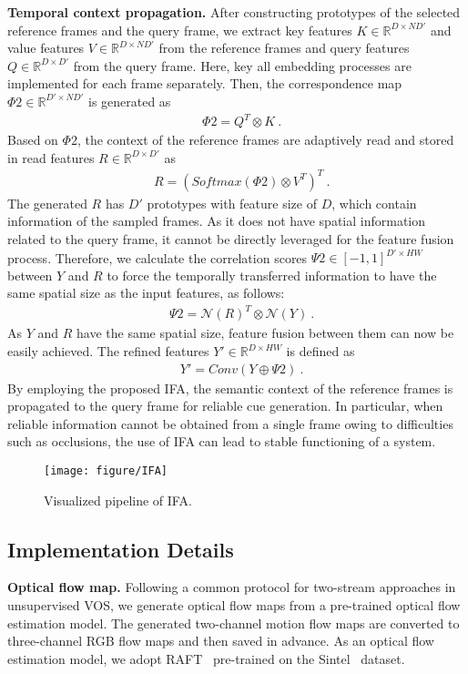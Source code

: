 \documentclass[10pt,twocolumn,letterpaper]{article}
\begin{document}
\vspace{1mm}
\noindent\textbf{Temporal context propagation.} After constructing prototypes of the selected reference frames and the query frame, we extract key features $K \in \mathbb{R}^{D \times ND'}$ and value features $V \in \mathbb{R}^{D \times ND'}$ from the reference frames and query features $Q \in \mathbb{R}^{D \times D'}$ from the query frame. Here, key all embedding processes are implemented for each frame separately. Then, the correspondence map $\Phi2 \in \mathbb{R}^{D' \times ND'}$ is generated as
\begin{align}
&\Phi2 = {Q}^{T} \otimes K~.
\end{align}
Based on $\Phi2$, the context of the reference frames are adaptively read and stored in read features $R \in \mathbb{R}^{D \times D'}$ as
\begin{align}
&R = (Softmax(\Phi2) \otimes {V}^{T})^{T}~.
\end{align}
The generated $R$ has $D'$ prototypes with feature size of $D$, which contain information of the sampled frames. As it does not have spatial information related to the query frame, it cannot be directly leveraged for the feature fusion process. Therefore, we calculate the correlation scores $\Psi2 \in [-1, 1]^{D'\times HW}$ between $Y$ and $R$ to force the temporally transferred information to have the same spatial size as the input features, as follows:
\begin{align}
&\Psi2 = \mathcal{N}(R)^{T} \otimes \mathcal{N}(Y)~.
\end{align}
As $Y$ and $R$ have the same spatial size, feature fusion between them can now be easily achieved. The refined features $Y' \in \mathbb{R}^{D \times HW}$ is defined as
\begin{align}
&Y' = Conv(Y \oplus \Psi2)~.
\end{align}
By employing the proposed IFA, the semantic context of the reference frames is propagated to the query frame for reliable cue generation. In particular, when reliable information cannot be obtained from a single frame owing to difficulties such as occlusions, the use of IFA can lead to stable functioning of a system. 



\begin{figure}[t]
\centering
\texttt{[image: figure/IFA]}
\caption{Visualized pipeline of IFA.}
\label{figure4}
\end{figure}


\subsection{Implementation Details}
\noindent\textbf{Optical flow map.} Following a common protocol for two-stream approaches in unsupervised VOS, we generate optical flow maps from a pre-trained optical flow estimation model. The generated two-channel motion flow maps are converted to three-channel RGB flow maps and then saved in advance. As an optical flow estimation model, we adopt RAFT~\cite{RAFT} pre-trained on the Sintel~\cite{Sintel} dataset. 
\end{document}
